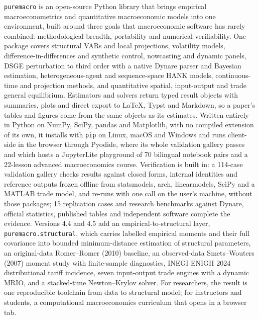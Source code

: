 \documentclass[11pt,letterpaper]{article}
\renewcommand{\_}{\pmunderscore\allowbreak}
\begin{document}
\begin{titlepage}
\begin{tcolorbox}[colback=lightslate,colframe=navy,boxrule=0.8pt,arc=3mm,title={\bfseries Abstract},
  fonttitle=\color{white}\bfseries,colbacktitle=navy,fontupper=\small]
\texttt{puremacro} is an open-source Python library that brings empirical macroeconometrics and quantitative macroeconomic models into one environment, built around three goals that macroeconomic software has rarely combined: methodological breadth, portability and numerical verifiability. One package covers structural VARs and local projections, volatility models, difference-in-differences and synthetic control, nowcasting and dynamic panels, DSGE perturbation to third order with a native Dynare parser and Bayesian estimation, heterogeneous-agent and sequence-space HANK models, continuous-time and projection methods, and quantitative spatial, input-output and trade general equilibrium. Estimators and solvers return typed result objects with summaries, plots and direct export to LaTeX, Typst and Markdown, so a paper's tables and figures come from the same objects as its estimates. Written entirely in Python on NumPy, SciPy, pandas and Matplotlib, with no compiled extension of its own, it installs with \texttt{pip} on Linux, macOS and Windows and runs client-side in the browser through Pyodide, where its whole validation gallery passes and which hosts a JupyterLite playground of 70 bilingual notebook pairs and a 22-lesson advanced macroeconomics course. Verification is built in: a 114-case validation gallery checks results against closed forms, internal identities and reference outputs frozen offline from statsmodels, arch, linearmodels, SciPy and a MATLAB trade model, and re-runs with one call on the user's machine, without those packages; 15 replication cases and research benchmarks against Dynare, official statistics, published tables and independent software complete the evidence. Versions 4.4 and 4.5 add an empirical-to-structural layer, \texttt{puremacro.structural}, which carries labelled empirical moments and their full covariance into bounded minimum-distance estimation of structural parameters, an original-data Romer--Romer (2010) baseline, an observed-data Smets--Wouters (2007) moment study with finite-sample diagnostics, INEGI ENIGH 2024 distributional tariff incidence, seven input-output trade engines with a dynamic MRIO, and a stacked-time Newton--Krylov solver. For researchers, the result is one reproducible toolchain from data to structural model; for instructors and students, a computational macroeconomics curriculum that opens in a browser tab.
\end{tcolorbox}
\end{titlepage}
\end{document}
